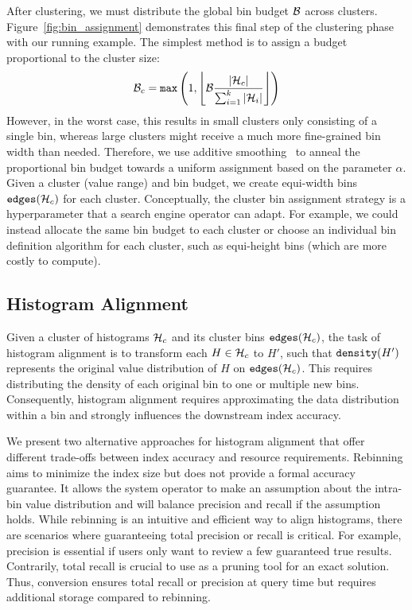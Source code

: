 After clustering, we must distribute the global bin budget $\mathcal{B}$ across clusters.
Figure~\ref{fig:bin_assignment} demonstrates this final step of the clustering phase with our running example.
The simplest method is to assign a budget proportional to the cluster size:
\begin{equation}
\label{eq:cluster_bin_budget}
\cB_c =  \FuncSty{max}\left(1, \left\lfloor \cB \frac{|\cH_c|}{\sum_{i=1}^k |\cH_i|} \right\rfloor \right)
\end{equation}
However, in the worst case, this results in small clusters only consisting of a single bin, whereas large clusters might receive a much more fine-grained bin width than needed.
Therefore, we use additive smoothing~\cite{manning_introduction_2008} to anneal the proportional bin budget towards a uniform assignment based on the parameter $\alpha$.
Given a cluster (value range) and bin budget, we create equi-width bins $\edges{\cH_c}$ for each cluster.
Conceptually, the cluster bin assignment strategy is a hyperparameter that a search engine operator can adapt.
For example, we could instead allocate the same bin budget to each cluster or choose an individual bin definition algorithm for each cluster, such as equi-height bins (which are more costly to compute).


\subsection{Histogram Alignment}
\label{sec:alignment}

Given a cluster of histograms $\mathcal{H}_c$ and its cluster bins $\edges{\cH_c}$, the task of histogram alignment is to transform each $H \in \mathcal{H}_c$ to $H'$, such that $\density{H'}$ represents the original value distribution of $H$ on $\edges{\cH_c}$.
This requires distributing the density of each original bin to one or multiple new bins.
Consequently, histogram alignment requires approximating the data distribution within a bin and strongly influences the downstream index accuracy.

We present two alternative approaches for histogram alignment that offer different trade-offs between index accuracy and resource requirements.
Rebinning aims to minimize the index size but does not provide a formal accuracy guarantee.
It allows the system operator to make an assumption about the intra-bin value distribution and will balance precision and recall if the assumption holds.
While rebinning is an intuitive and efficient way to align histograms, there are scenarios where guaranteeing total precision or recall is critical.
For example, precision is essential if users only want to review a few guaranteed true results.
Contrarily, total recall is crucial to use \system{} as a pruning tool for an exact solution.
Thus, conversion ensures total recall or precision at query time but requires additional storage compared to rebinning.

